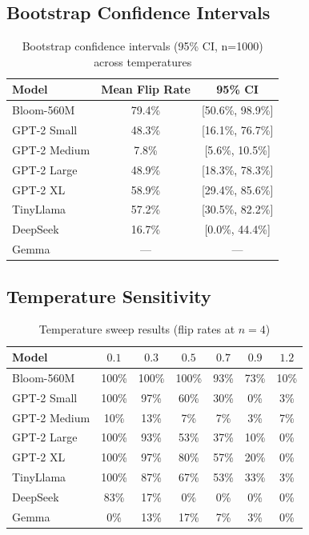 \documentclass{article}
\begin{document}
\subsection{Bootstrap Confidence Intervals}

\begin{table}[H]
\centering
\caption{Bootstrap confidence intervals (95\% CI, n=1000) across temperatures}
\label{tab:bootstrap}
\begin{tabular}{lcc}
\toprule
Model & Mean Flip Rate & 95\% CI \\
\midrule
Bloom-560M & 79.4\% & [50.6\%, 98.9\%] \\
GPT-2 Small & 48.3\% & [16.1\%, 76.7\%] \\
GPT-2 Medium & 7.8\% & [5.6\%, 10.5\%] \\
GPT-2 Large & 48.9\% & [18.3\%, 78.3\%] \\
GPT-2 XL & 58.9\% & [29.4\%, 85.6\%] \\
TinyLlama & 57.2\% & [30.5\%, 82.2\%] \\
DeepSeek & 16.7\% & [0.0\%, 44.4\%] \\
Gemma & — & — \\
\bottomrule
\end{tabular}
\end{table}

\subsection{Temperature Sensitivity}

\begin{table}[H]
\centering
\caption{Temperature sweep results (flip rates at $n=4$)}
\label{tab:temperature}
\begin{tabular}{lcccccc}
\toprule
Model & $0.1$ & $0.3$ & $0.5$ & $0.7$ & $0.9$ & $1.2$ \\
\midrule
Bloom-560M & 100\% & 100\% & 100\% & 93\% & 73\% & 10\% \\
GPT-2 Small & 100\% & 97\% & 60\% & 30\% & 0\% & 3\% \\
GPT-2 Medium & 10\% & 13\% & 7\% & 7\% & 3\% & 7\% \\
GPT-2 Large & 100\% & 93\% & 53\% & 37\% & 10\% & 0\% \\
GPT-2 XL & 100\% & 97\% & 80\% & 57\% & 20\% & 0\% \\
TinyLlama & 100\% & 87\% & 67\% & 53\% & 33\% & 3\% \\
DeepSeek & 83\% & 17\% & 0\% & 0\% & 0\% & 0\% \\
Gemma & 0\% & 13\% & 17\% & 7\% & 3\% & 0\% \\
\bottomrule
\end{tabular}
\end{table}
\end{document}

